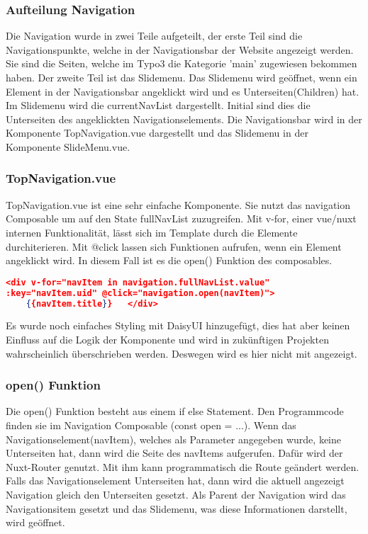 \subsubsection{Aufteilung Navigation}
\label{sec:Aufteilung Navigation}

Die Navigation wurde in zwei Teile aufgeteilt, der erste Teil sind die Navigationspunkte, welche in der Navigationsbar der Website angezeigt werden. Sie sind die Seiten, welche im Typo3 die Kategorie 'main' zugewiesen bekommen haben. Der zweite Teil ist das Slidemenu. Das Slidemenu wird geöffnet, wenn ein Element in der Navigationsbar angeklickt wird und es Unterseiten(Children) hat. Im Slidemenu wird die currentNavList dargestellt. Initial sind dies die Unterseiten des angeklickten Navigationselements. Die Navigationsbar wird in der Komponente TopNavigation.vue dargestellt und das Slidemenu in der Komponente SlideMenu.vue.

\subsubsection{TopNavigation.vue}
\label{sec:TopNavigation.vue}

TopNavigation.vue ist eine sehr einfache Komponente. Sie nutzt das navigation Composable um auf den State fullNavList zuzugreifen. Mit v-for, einer vue/nuxt internen Funktionalität, lässt sich im Template durch die Elemente durchiterieren. Mit @click lassen sich Funktionen aufrufen, wenn ein Element angeklickt wird. In diesem Fall ist es die open() Funktion des composables.
\begin{lstlisting}[language=json,firstnumber=1]
<div v-for="navItem in navigation.fullNavList.value" 
:key="navItem.uid" @click="navigation.open(navItem)">
	{{navItem.title}}	</div>
\end{lstlisting}
Es wurde noch einfaches Styling mit DaisyUI hinzugefügt, dies hat aber keinen Einfluss auf die Logik der Komponente und wird in zukünftigen Projekten wahrscheinlich überschrieben werden. Deswegen wird es hier nicht mit angezeigt.

\subsubsection{open() Funktion}
\label{sec:open() Funktion}

Die open() Funktion besteht aus einem if else Statement. Den Programmcode finden sie im Navigation Composable  (const open = ...). Wenn das Navigationselement(navItem), welches als Parameter angegeben wurde, keine Unterseiten hat, dann wird die Seite des navItems aufgerufen. Dafür wird der Nuxt-Router genutzt. Mit ihm kann programmatisch die Route geändert werden. Falls das Navigationselement Unterseiten hat, dann wird die aktuell angezeigt Navigation gleich den Unterseiten gesetzt. Als Parent der Navigation wird das Navigationsitem gesetzt und das Slidemenu, was diese Informationen darstellt, wird geöffnet.

